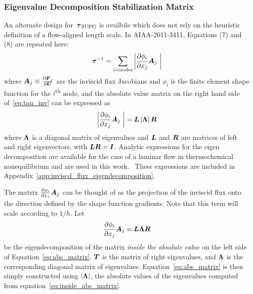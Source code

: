 \subsubsection{Eigenvalue Decomposition Stabilization Matrix}
An alternate design for~${\boldsymbol{\tau}}_{\text{SUPG}}$ is availbile which does not rely on the heuristic definition of a flow-aligned length scale. In AIAA-2011-3411, Equations (7) and (8) are repeated here:
\begin{equation}
  {\boldsymbol{\tau}}^{-1} = \sum_{i=\text{nodes}} \left|{\frac{\partial{\phi_i}}{\partial{x_j}}} {\boldsymbol{A}}_j\ \right|
  \label{eq:tau_inv}
\end{equation}
where ${\boldsymbol{A}}_j\equiv {\frac{\partial{{\boldsymbol{F}}_j}}{\partial{{\boldsymbol{U}}}}}$ are the inviscid flux Jacobians and $\phi_i$ is the finite element shape function for the $i$\textsuperscript{th} node, and the absolute value matrix on the right hand side of~\eqref{eq:tau_inv} can be expressed as
\begin{equation}
  \left|{\frac{\partial{\phi_i}}{\partial{x_j}}} {\boldsymbol{A}}_j\ \right| = {\boldsymbol{L}} \left|{\boldsymbol{\Lambda}}\right| {\boldsymbol{R}}
  \label{eq:abs_matrix}
\end{equation}
where ${\boldsymbol{\Lambda}}$ is a diagonal matrix of eigenvalues and  ${\boldsymbol{L}}$ and ${\boldsymbol{R}}$ are matrices of left and right eigenvectors, with ${\boldsymbol{L}}{\boldsymbol{R}}={\boldsymbol{I}}$.  Analytic expressions for the eigen decomposition are available for the case of a laminar flow in thermochemical nonequilibrium and are used in this work.~\cite{gnoffo_conservation_laws}  These expressions are included in Appendix~\ref{app:inviscd_flux_eigendecomposition}.

The matrix ${\frac{\partial{\phi_i}}{\partial{x_j}}} {\boldsymbol{A}}_j$ can be thought of as the projection of the inviscid flux onto the direction defined by the shape function gradients. Note that this term will scale according to $1/h$.  Let
\begin{equation}
  {\frac{\partial{\phi_i}}{\partial{x_j}}} {\boldsymbol{A}}_j = {\boldsymbol{L}} {\boldsymbol{\Lambda}} {\boldsymbol{R}}
  \label{eq:inside_abs_matrix}
\end{equation}
be the eigendecomposition of the matrix \emph{inside the absolute value} on the left side of Equation~\eqref{eq:abs_matrix}.   ${\boldsymbol{T}}$ is the matrix of right eigenvalues, and ${\boldsymbol{\Lambda}}$ is the corresponding diagonal matrix of eigenvalues.  Equation~\eqref{eq:abs_matrix} is then simply constructed using $\left|{\boldsymbol{\Lambda}}\right|$, the absolute values of the eigenvalues computed from equation~\eqref{eq:inside_abs_matrix}.

